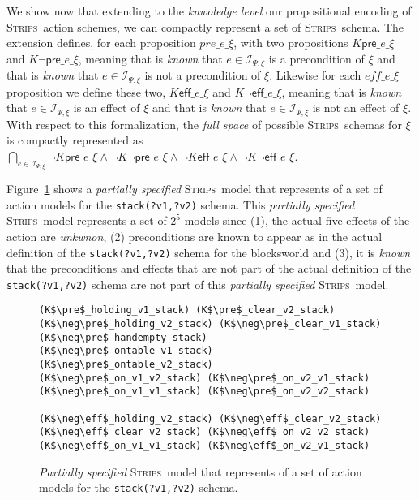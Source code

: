 \documentclass{article}
\newcommand{\pre}{\mathsf{pre}}     %
\newcommand{\eff}{\mathsf{eff}}     %
\newcommand{\strips}{\textsc{Strips}}
\begin{document}
We show now that extending to the {\em knwoledge level} our propositional encoding of \strips\ action schemes, we can compactly represent a set of \strips\ schema. The extension defines, for each proposition {\tt\small $pre\_e\_\xi$}, with two propositions {\tt\small $K\pre\_e\_\xi$} and {\tt\small $K\neg\pre\_e\_\xi$}, meaning that is {\em known} that $e\in{\mathcal I}_{\Psi,\xi}$ is a precondition of $\xi$ and that is {\em known} that $e\in{\mathcal I}_{\Psi,\xi}$ is not a precondition of $\xi$. Likewise for each {\tt\small $eff\_e\_\xi$} proposition we define these two, {\tt\small $K\eff\_e\_\xi$} and {\tt\small $K\neg\eff\_e\_\xi$}, meaning that is {\em known} that $e\in{\mathcal I}_{\Psi,\xi}$ is an effect of $\xi$ and that is {\em known} that $e\in{\mathcal I}_{\Psi,\xi}$ is not an effect of $\xi$. With respect to this formalization, the {\em full space} of possible \strips\ schemas for $\xi$ is compactly represented as {\tt\small $\bigcap_{e\in{\mathcal I}_{\Psi,\xi}} \neg K\pre\_e\_\xi\wedge \neg K\neg\pre\_e\_\xi \wedge\neg K\eff\_e\_\xi\wedge \neg K\neg\eff\_e\_\xi$}.

Figure~\ref{fig:partial} shows a {\em partially specified} \strips\ model that represents of a set of action models for the {\tt\small stack(?v1,?v2)} schema. This {\em partially specified} \strips\ model represents a set of $2^5$ models since (1), the actual five effects of the action are {\em unkwnon}, (2) preconditions are known to appear as in the actual definition of the {\tt\small stack(?v1,?v2)} schema for the blocksworld and (3), it is {\em known} that the preconditions and effects that are not part of the actual definition of the {\tt\small stack(?v1,?v2)} schema are not part of this {\em partially specified} \strips\ model.

\begin{figure}
  \begin{tiny}  
 \begin{lstlisting}
(K$\pre$_holding_v1_stack) (K$\pre$_clear_v2_stack)
(K$\neg\pre$_holding_v2_stack) (K$\neg\pre$_clear_v1_stack)
(K$\neg\pre$_handempty_stack) 
(K$\neg\pre$_ontable_v1_stack) (K$\neg\pre$_ontable_v2_stack)
(K$\neg\pre$_on_v1_v2_stack) (K$\neg\pre$_on_v2_v1_stack)
(K$\neg\pre$_on_v1_v1_stack) (K$\neg\pre$_on_v2_v2_stack) 

(K$\neg\eff$_holding_v2_stack) (K$\neg\eff$_clear_v2_stack)
(K$\neg\eff$_clear_v2_stack) (K$\neg\eff$_on_v2_v2_stack)
(K$\neg\eff$_on_v1_v1_stack) (K$\neg\eff$_on_v2_v1_stack)
  \end{lstlisting}           
  \end{tiny}  
 \caption{\small {\em Partially specified} \strips\ model that represents of a set of action models for the {\tt\small stack(?v1,?v2)} schema.}
\label{fig:partial}
\end{figure}
\end{document}
